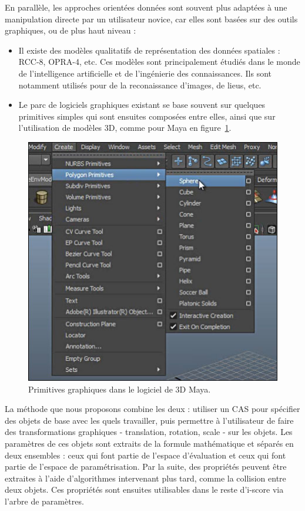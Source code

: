 \documentclass[french,12pt]{article}
\begin{document}
En parallèle, les approches orientées données sont souvent plus adaptées à une manipulation directe par un utilisateur novice, car elles sont basées sur des outils graphiques, ou de plus haut niveau : 
\begin{itemize}
\item Il existe des modèles qualitatifs de représentation des données spatiales : RCC-8, OPRA-4, etc. Ces modèles sont principalement étudiés dans le monde de l'intelligence artificielle et de l'ingénierie des connaissances. Ils sont notamment utilisés pour de la reconaissance d'images, de lieus, etc.
\item Le parc de logiciels graphiques existant se base souvent sur quelques primitives simples qui sont ensuites composées entre elles, ainsi que sur l'utilisation de modèles 3D, comme pour Maya en figure~\ref{fig.maya}.

\end{itemize}

\begin{figure}[h]
\centering
\includegraphics[scale=0.5]{images/maya.jpg}
\caption{Primitives graphiques dans le logiciel de 3D Maya.}
\label{fig.maya}
\end{figure} 

La méthode que nous proposons combine les deux : utiliser un \ac{CAS} pour spécifier des objets de base avec les quels travailler, puis permettre à l'utilisateur de faire des transformations graphiques - translation, rotation, scale - sur les objets. Les paramètres de ces objets sont extraits de la formule mathématique et séparés en deux ensembles : ceux qui font partie de l'espace d'évaluation et ceux qui font partie de l'espace de paramétrisation. Par la suite, des propriétés peuvent être extraites à l'aide d'algorithmes intervenant plus tard, comme la collision entre deux objets. Ces propriétés sont ensuites utilisables dans le reste d'i-score via l'arbre de paramètres.
\end{document}
